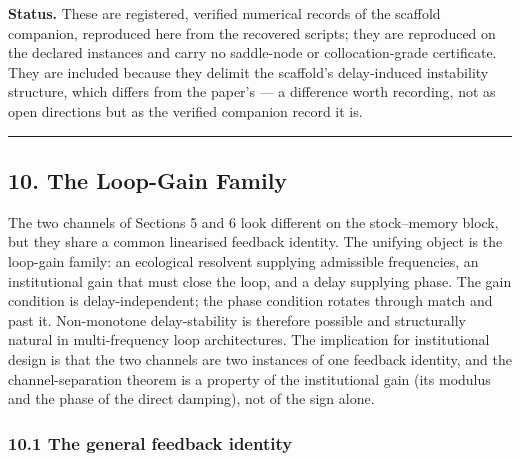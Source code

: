 \documentclass[11pt]{article}
\begin{document}
\textbf{Status.} These are registered, verified numerical records of the
scaffold companion, reproduced here from the recovered scripts; they are
reproduced on the declared instances and carry no saddle-node or
collocation-grade certificate. They are included because they delimit
the scaffold's delay-induced instability structure, which differs from
the paper's --- a difference worth recording, not as open directions but
as the verified companion record it is.

\begin{center}\rule{0.5\linewidth}{0.5pt}\end{center}

\subsection{10. The Loop-Gain Family}\label{the-loop-gain-family}

The two channels of Sections 5 and 6 look different on the stock--memory
block, but they share a common linearised feedback identity. The
unifying object is the loop-gain family: an ecological resolvent
supplying admissible frequencies, an institutional gain that must close
the loop, and a delay supplying phase. The gain condition is
delay-independent; the phase condition rotates through match and past
it. Non-monotone delay-stability is therefore possible and structurally
natural in multi-frequency loop architectures. The implication for
institutional design is that the two channels are two instances of one
feedback identity, and the channel-separation theorem is a property of
the institutional gain (its modulus and the phase of the direct
damping), not of the sign alone.

\subsubsection{10.1 The general feedback
identity}\label{the-general-feedback-identity}
\end{document}
